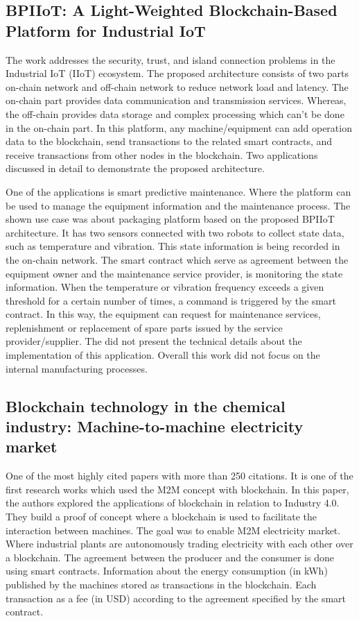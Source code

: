 \documentclass[runningheads]{llncs}
\begin{document}
\subsection{BPIIoT: A Light-Weighted Blockchain-Based
Platform for Industrial IoT \cite{Bai2019}}
The work addresses the security, trust, and island connection problems in the Industrial IoT (IIoT) ecosystem. The proposed architecture consists of two parts on-chain network and off-chain network to reduce network load and latency. The on-chain part provides data communication and transmission services. Whereas, the off-chain provides data storage and complex processing which can't be done in the on-chain part. In this platform, any machine/equipment can add operation data to the blockchain, send transactions to the related smart contracts, and receive transactions from other nodes in the blockchain. Two applications discussed in detail to demonstrate the proposed architecture.\bigbreak 

\noindent 
One of the applications is smart predictive maintenance. Where the platform can be used to manage the equipment information and the maintenance process. The shown use case was about packaging platform based on the proposed BPIIoT architecture. It has two sensors connected with two robots to collect state data, such as temperature and vibration. This state information is being recorded in the on-chain network. The smart contract which serve as agreement between the equipment owner and the maintenance service provider, is monitoring the state information. When the temperature or vibration frequency exceeds a given threshold for a certain number of times, a command is triggered by the smart contract. In this way, the equipment can request for maintenance services, replenishment or replacement of spare parts issued by the service provider/supplier. The did not present the technical details about the implementation of this application. Overall this work did not focus on the internal manufacturing processes. 

\subsection{Blockchain technology in the chemical industry: Machine-to-machine electricity market \cite{Sikorski2017}}

One of the most highly cited papers with more than 250 citations. It is one of the first research works which used the M2M concept with blockchain. In this paper, the authors explored the applications of blockchain in relation to Industry 4.0. They build a proof of concept where a blockchain is used to facilitate the interaction between machines. The goal was to enable M2M electricity market. Where industrial plants are autonomously trading electricity with each other over a blockchain. The agreement between the producer and the consumer is done using smart contracts. Information about the energy consumption (in kWh) published by the machines stored as transactions in the blockchain. Each transaction as a fee (in USD) according to the agreement specified by the smart contract. \bigbreak
\end{document}
